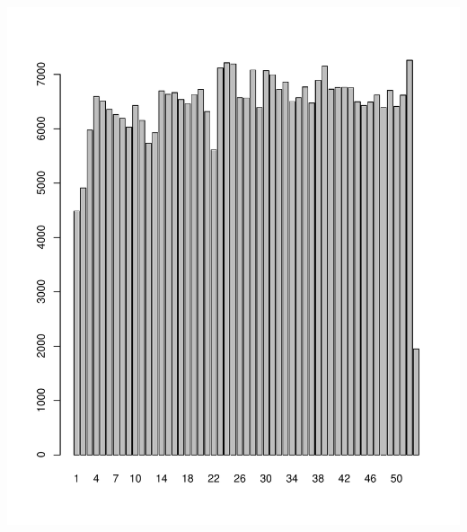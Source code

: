 \documentclass[12pt,english,french,twoside]{book}\usepackage[]{graphicx}\usepackage[]{color}
\makeatletter
\def\maxwidth{ %
  \ifdim\Gin@nat@width>\linewidth
    \linewidth
  \else
    \Gin@nat@width
  \fi
}
\makeatother
\begin{document}
\includegraphics[width=\maxwidth]{figure/act_sem} 
\end{document}
